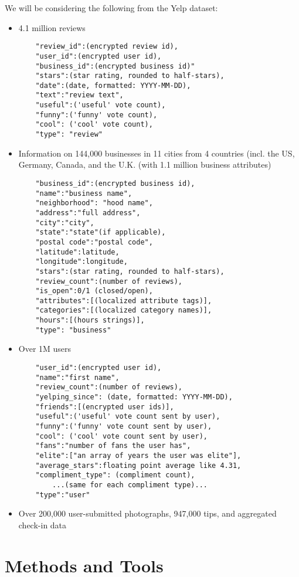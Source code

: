 \quad We will be considering the following from the Yelp dataset:

\begin{itemize}
	\item{4.1 million reviews}
	\begin{verbatim}
	"review_id":(encrypted review id),
	"user_id":(encrypted user id),
	"business_id":(encrypted business id)"
	"stars":(star rating, rounded to half-stars),
	"date":(date, formatted: YYYY-MM-DD),
	"text":"review text",
	"useful":('useful' vote count),
	"funny":('funny' vote count),
	"cool": ('cool' vote count),
	"type": "review"
	\end{verbatim}
	\item{Information on 144,000 businesses in 11 cities from 4 countries (incl. the US, Germany, Canada, and the U.K. (with 1.1 million business attributes)}
	\begin{verbatim}
	"business_id":(encrypted business id),
	"name":"business name",
	"neighborhood": "hood name",
	"address":"full address",
	"city":"city",
	"state":"state"(if applicable),
	"postal code":"postal code",
	"latitude":latitude,
	"longitude":longitude,
	"stars":(star rating, rounded to half-stars),
	"review_count":(number of reviews),
	"is_open":0/1 (closed/open),
	"attributes":[(localized attribute tags)],
	"categories":[(localized category names)],
	"hours":[(hours strings)],
	"type": "business"
	\end{verbatim}
	\item{Over 1M users}
	\begin{verbatim}
	"user_id":(encrypted user id),
	"name":"first name",
	"review_count":(number of reviews),
	"yelping_since": (date, formatted: YYYY-MM-DD),
	"friends":[(encrypted user ids)],
	"useful":('useful' vote count sent by user),
	"funny":('funny' vote count sent by user),
	"cool": ('cool' vote count sent by user),
	"fans":"number of fans the user has",
	"elite":["an array of years the user was elite"],
	"average_stars":floating point average like 4.31,
	"compliment_type": (compliment count),
		...(same for each compliment type)...
	"type":"user"
	\end{verbatim}
	\item{Over 200,000 user-submitted photographs, 947,000 tips, and aggregated check-in data}
\end{itemize}

\section{Methods and Tools}

